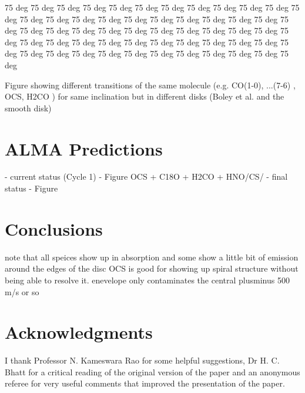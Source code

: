\documentclass[useAMS,usenatbib]{mn2e}
\begin{document}
75 deg 75 deg 75 deg 75 deg 75 deg 75 deg 75 deg 75 deg 75 deg 75 deg 75 deg 75 deg 75 deg 75 deg 75 deg 75 deg 75 deg 75 deg 75 deg 75 deg 75 deg 75 deg 75 deg 75 deg 75 deg 75 deg 75 deg 75 deg 75 deg 75 deg 75 deg 75 deg 75 deg 75 deg 75 deg 75 deg 75 deg 75 deg 75 deg 75 deg 75 deg 75 deg 75 deg 75 deg 75 deg 75 deg 75 deg 75 deg 75 deg 75 deg 75 deg 75 deg 75 deg 75 deg 75 deg 75 deg 


Figure showing different transitions of the same molecule (e.g. CO(1-0), ...(7-6) , OCS,  H2CO ) for same inclination but in different disks (Boley et al. and the smooth disk)

\section{ALMA Predictions}

- current status (Cycle 1) - Figure
OCS + C18O + H2CO + HNO/CS/
- final status - Figure 


\section{Conclusions}

note that all speices show up in absorption and some show a little bit of emission around the edges of the disc
OCS is good for showing up spiral structure without being able to resolve it.
enevelope only contaminates the central plusminus 500 m/s or so


\section*{Acknowledgments}

I thank Professor N. Kameswara Rao for some helpful suggestions,
Dr H. C. Bhatt for a critical reading of the original version of the
paper and an anonymous referee for very useful comments that improved
the presentation of the paper.
\end{document}
